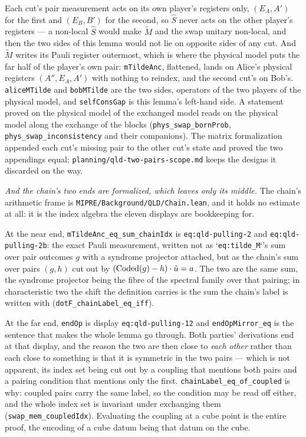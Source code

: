 Each cut's pair measurement acts on its own player's registers only, $(E_A, A')$ for the first and
$(E_B, B')$ for the second, so $\widehat{S}$ never acts on the other player's registers --- a
non-local $\widehat{S}$ would make $\tilde{M}$ and the swap unitary non-local, and then the two
sides of this lemma would not lie on opposite sides of any cut. And $\tilde{M}$ writes its Pauli
register outermost, which is where the physical model puts the far half of the player's own pair:
\texttt{mTildeAnc}, flattened, lands on Alice's physical registers $(A'', E_A, A')$ with nothing to
reindex, and the second cut's on Bob's. \texttt{aliceMTilde} and \texttt{bobMTilde} are the two
sides, operators of the two players of the physical model, and \texttt{selfConsGap} is this
lemma's left-hand side. A statement proved on the physical model of the exchanged model reads on
the physical model along the exchange of the blocks (\texttt{phys\_swap\_bornProb},
\texttt{phys\_swap\_inconsistency} and their companions). The matrix formalization appended each
cut's missing pair to the other cut's state and proved the two appendings equal;
\texttt{planning/qld-two-pairs-scope.md} keeps the designs it discarded on the way.

\emph{And the chain's two ends are formalized, which leaves only its middle.} The chain's
arithmetic frame is \texttt{MIPRE/Background/QLD/Chain.lean}, and it holds no estimate at all: it
is the index algebra the eleven displays are bookkeeping for.

At the near end, \texttt{mTildeAnc\_eq\_sum\_chainIdx} is \texttt{eq:qld-pulling-2} and
\texttt{eq:qld-pulling-2b}: the exact Pauli measurement, written not as `\texttt{eq:tilde\_M}`'s
sum over pair outcomes $g$ with a syndrome projector attached, but as the chain's sum over pairs
$(g,h)$ cut out by $(\mathrm{Coded}(g) - h) \cdot \tilde{u} = a$. The two are the same sum, the syndrome
projector being the fibre of the spectral family over that pairing; in characteristic two the shift
the definition carries is the sum the chain's label is written with
(\texttt{dotF\_chainLabel\_eq\_iff}).

At the far end, \texttt{endOp} is display \texttt{eq:qld-pulling-12} and
\texttt{endOpMirror\_eq} is the sentence that makes the whole lemma go through. Both parties'
derivations end at that display, and the reason the two are then close to \emph{each other} rather
than each close to something is that it is symmetric in the two pairs --- which is not apparent, its
index set being cut out by a coupling that mentions both pairs and a pairing condition that mentions
only the first. \texttt{chainLabel\_eq\_of\_coupled} is why: coupled pairs carry the same label, so
the condition may be read off either, and the whole index set is invariant under exchanging them
(\texttt{swap\_mem\_coupledIdx}). Evaluating the coupling at a cube point is the entire proof, the
encoding of a cube datum being that datum on the cube.

